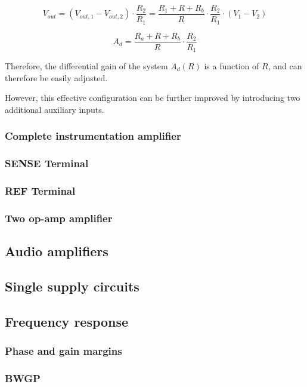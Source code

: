 \documentclass[../main.tex]{subfiles}
\begin{document}
\begin{equation}
	V_{out} = (V_{out,1} - V_{out,2}) \cdot \frac{R_2}{R_1} = \frac{R_1 + R + R_b}{R} \cdot \frac{R_2}{R_1} \cdot	(V_1 - V_2)
\end{equation}

\begin{equation}
	A_d = \frac{R_a + R + R_b}{R} \cdot \frac{R_2}{R_1}
\end{equation}

Therefore, the differential gain of the system $A_d(R)$ is a function of $R$, and can therefore be easily adjusted. 

However, this effective configuration can be further improved by introducing two additional auxiliary inputs.

\subsubsection*{Complete instrumentation amplifier}


\subsubsection{SENSE Terminal}

\subsubsection{REF Terminal}






\subsubsection{Two op-amp amplifier}

\subsection{Audio amplifiers}
\subsection{Single supply circuits}


\subsection{Frequency response}

\subsubsection{Phase and gain margins}
\subsubsection{BWGP}




%
\end{document}
